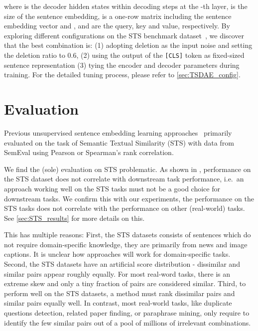 \documentclass[11pt]{article}
\begin{document}
where  is the decoder hidden states within  decoding steps at the -th layer,  is the size of the sentence embedding,  is a one-row matrix including the sentence embedding vector and ,  and  are the query, key and value, respectively. 
By exploring different configurations on the  STS benchmark dataset~\citep{cer-etal-2017-semeval}, we discover that the best combination is: (1) adopting deletion as the input noise and setting the deletion ratio to 0.6, (2) using the output of the \texttt{[CLS]} token as fixed-sized sentence representation (3) tying the encoder and decoder parameters during training. For the detailed tuning process, please refer to \autoref{sec:TSDAE_config}.


\section{Evaluation} \label{sec:eval}

Previous unsupervised sentence embedding learning approaches~\citep{DBLP:journals/corr/abs-2006-03659,carlsson2021semantic,DBLP:conf/emnlp/LiZHWYL20,su2021whitening, gao2021simcse} primarily evaluated on the task of Semantic Textual Similarity (STS) with data from SemEval using Pearson or Spearman's rank correlation. 

We find the (sole) evaluation on STS problematic. As shown in \cite{DBLP:conf/coling/ReimersBG16}, performance on the STS dataset does not correlate with downstream task performance, i.e.\ an approach working well on the STS tasks must not be a good choice for downstream tasks. We confirm this with our experiments, the performance on the STS tasks does not correlate with the performance on other (real-world) tasks. See \autoref{sec:STS_results} for more details on this.

This has multiple reasons: First, the STS datasets consists of sentences which do not require domain-specific knowledge, they are primarily from news and image captions. It is unclear how approaches will work for domain-specific tasks. Second, the STS datasets have an artificial score distribution - dissimilar and similar pairs appear roughly equally. For most real-word tasks, there is an extreme skew and only a tiny fraction of pairs are considered similar. Third, to perform well on the STS datasets, a method must rank dissimilar pairs and similar pairs equally well. In contrast, most real-world tasks, like duplicate questions detection, related paper finding, or paraphrase mining, only require to identify the few similar pairs out of a pool of millions of irrelevant combinations. 
\end{document}
